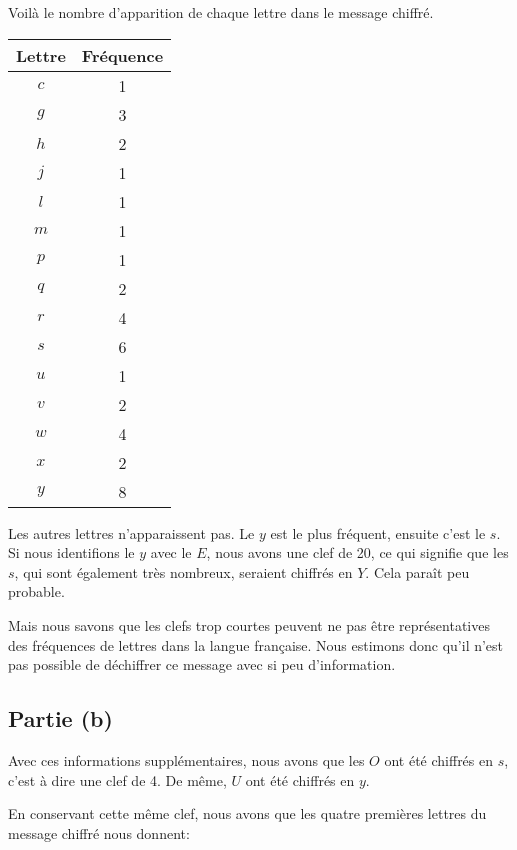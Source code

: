 \documentclass[12pt]{article}
\begin{document}
Voilà le nombre d'apparition de chaque lettre dans le message chiffré.
\begin{center}
    \begin{tabular}{|c|c|}
        \hline
        Lettre & Fréquence \\
        \hline
        $c$    & 1         \\
        $g$    & 3         \\
        $h$    & 2         \\
        $j$    & 1         \\
        $l$    & 1         \\
        $m$    & 1         \\
        $p$    & 1         \\
        $q$    & 2         \\
        $r$    & 4         \\
        $s$    & 6         \\
        $u$    & 1         \\
        $v$    & 2         \\
        $w$    & 4         \\
        $x$    & 2         \\
        $y$    & 8         \\
        \hline
    \end{tabular}
\end{center}

Les autres lettres n'apparaissent pas. Le $y$ est le plus fréquent, ensuite c'est le $s$. \\
Si nous identifions le $y$ avec le $E$, nous avons une clef de 20, ce qui signifie que les $s$, qui sont également très nombreux, seraient chiffrés en $Y$. Cela paraît peu probable.

Mais nous savons que les clefs trop courtes peuvent ne pas être représentatives des fréquences de lettres dans la langue française. Nous estimons donc qu'il n'est pas possible de déchiffrer ce message avec si peu d'information.

\subsection{Partie (b)}

Avec ces informations supplémentaires, nous avons que les $O$ ont été chiffrés en $s$, c'est à dire une clef de 4. De même, $U$ ont été chiffrés en $y$.

En conservant cette même clef, nous avons que les quatre premières lettres du message chiffré nous donnent:
\end{document}
